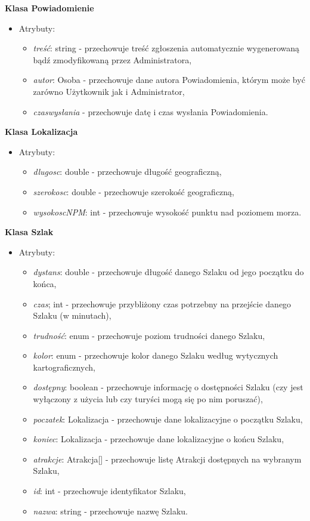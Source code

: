     \textbf{Klasa Powiadomienie} 
    \begin{itemize}
        \item []Atrybuty:
        \begin{itemize}
            \item \textit{treść}: string - przechowuje treść zgłoszenia automatycznie wygenerowaną bądź zmodyfikowaną przez Administratora,
            \item \textit{autor}: Osoba - przechowuje dane autora Powiadomienia, którym może być zarówno Użytkownik jak i Administrator,
            \item \textit{czaswysłania} - przechowuje datę i czas wysłania Powiadomienia.
        \end{itemize}
    \end{itemize}
    \textbf{Klasa Lokalizacja}
    \begin{itemize}
        \item []Atrybuty:
        \begin{itemize}
            \item \textit{dlugosc}: double - przechowuje długość geograficzną,
            \item \textit{szerokosc}: double - przechowuje szerokość geograficzną,
            \item \textit{wysokoscNPM}: int - przechowuje wysokość punktu nad poziomem morza.
        \end{itemize}
    \end{itemize}
    \textbf{Klasa Szlak}
    \begin{itemize}
        \item []Atrybuty:
        \begin{itemize}
            \item \textit{dystans}: double - przechowuje długość danego Szlaku od jego początku do końca,
            \item \textit{czas}; int - przechowuje przybliżony czas potrzebny na przejście danego Szlaku (w minutach),
            \item \textit{trudność}: enum - przechowuje poziom trudności danego Szlaku,
            \item \textit{kolor}: enum - przechowuje kolor danego Szlaku według wytycznych kartograficznych,
            \item \textit{dostępny}: boolean - przechowuje informację o dostępności Szlaku (czy jest wyłączony z użycia lub czy turyści mogą się po nim poruszać),
            \item \textit{poczatek}: Lokalizacja - przechowuje dane lokalizacyjne o początku Szlaku,
            \item \textit{koniec}: Lokalizacja - przechowuje dane lokalizacyjne o końcu Szlaku,
            \item \textit{atrakcje}: Atrakcja[] - przechowuje listę Atrakcji dostępnych na wybranym Szlaku,
            \item \textit{id}: int - przechowuje identyfikator Szlaku,
            \item \textit{nazwa}: string - przechowuje nazwę Szlaku.
        \end{itemize}
    \end{itemize}
